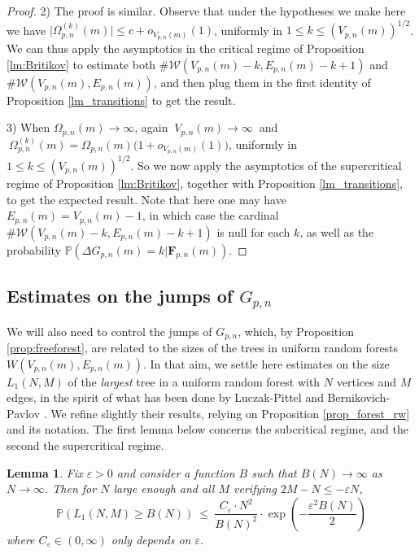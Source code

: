 \documentclass[a4, 11pt]{article}
\numberwithin{equation}{section}
\theoremstyle{plain}
\newtheorem{lemma}[theorem]{Lemma}
\theoremstyle{definition}
\theoremstyle{remark}
\begin{document}
\begin{proof}
2) The proof is similar. Observe that under the hypotheses we make here we have $\big\lvert\Omega_{p,n}^{(k)}(m)\big\rvert\leq c+o_{V_{p,n}(m)}(1)$, uniformly in $1\leq k\leq (V_{p,n}(m))^{1/2}$. 
 We can thus apply the asymptotics in the critical regime of Proposition \ref{lm:Britikov} to estimate both $\#\mathcal{W}\left(V_{p,n}(m)-k,E_{p,n}(m)-k+1\right)$ and \linebreak $\#\mathcal{W}\left(V_{p,n}(m),E_{p,n}(m)\right)$, and then plug them in the first identity of Proposition \ref{lm_transitions} to get the result.
 
3) When $\Omega_{p,n}(m)\to \infty$, again $~V_{p,n}(m)\to \infty~$ and $~\Omega_{p,n}^{(k)}(m)= \Omega_{p,n}(m)\big(1+o_{V_{p,n}(m)}(1)\big)$, uniformly in $1\leq k\leq \left(V_{p,n}(m)\right)^{1/2}$. So we now apply the asymptotics of the supercritical regime of Proposition \ref{lm:Britikov}, together with Proposition \ref{lm_transitions}, to get the expected result. Note that here one may have $E_{p,n}(m)=V_{p,n}(m)-1$, in which case the cardinal $\#\mathcal{W}(V_{p,n}(m)-k,E_{p,n}(m)-k+1)$ is null for each $k$, as well as the probability $\mathbb{P}\left( \Delta G_{p,n}(m)=k  | \mathbf{F}_{p,n}(m)\right)$. 
\end{proof}



\subsection{Estimates on the jumps of $G_{p,n}$}
\label{sec:largest_jump}

We will also need to control the jumps of $G_{p,n}$, which, by Proposition \ref{prop:freeforest}, are related to the sizes of the trees in uniform random forests $W(V_{p,n}(m),E_{p,n}(m))$. In that aim, we settle here estimates on the size $L_1(N,M)$  of the \emph{largest} tree in a uniform random forest  with $N$ vertices and $M$ edges, in the spirit of what has been done by Luczak-Pittel \cite{LuczakPittel92} and Bernikovich-Pavlov \cite{BernikovichPavlov11}. We refine slightly their results, relying on Proposition \ref{prop_forest_rw} and its notation. The first lemma below  concerns the subcritical regime, and the second the supercritical regime. 


\begin{lemma}\label{lm:forest:sub}
Fix $\varepsilon>0$ and consider  a function $B$ such that $B(N)\to \infty $ as $N\to \infty$. Then for $N$ large enough and all $M$ verifying $2M-N\leq -\varepsilon N$,
$$\mathbb{P}\left(L_1(N,M)\geq B(N)\right)~\leq~\frac{C_{\varepsilon}\cdot N^{2}}{B(N)^2} \cdot \exp\left(-\frac{\varepsilon^2 B(N)}{2}\right)$$
where $C_{\varepsilon}\in (0,\infty)$ only depends on $\varepsilon$.
\end{lemma}
\end{document}
